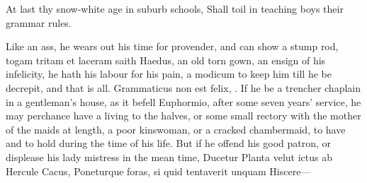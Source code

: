 {At last thy snow-white age in suburb schools,
Shall toil in teaching boys their grammar rules.

Like an ass, he wears out his time for provender, and can show a stump
rod, togam tritam et laceram saith Haedus, an old torn gown, an
ensign of his infelicity, he hath his labour for his pain, a modicum to
keep him till he be decrepit, and that is all. Grammaticus non est
felix, \etc{}. If he be a trencher chaplain in a gentleman's house, as it
befell  Euphormio, after some seven years' service, he may
perchance have a living to the halves, or some small rectory with the
mother of the maids at length, a poor kinswoman, or a cracked
chambermaid, to have and to hold during the time of his life. But if he
offend his good patron, or displease his lady mistress in the mean
time,
Ducetur Planta velut ictus ab Hercule Cacus,
Poneturque foras, si quid tentaverit unquam
Hiscere---

}
